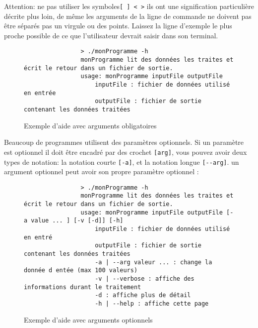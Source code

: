 		Attention: ne pas utiliser les symboles\verb+[ ] < >+ ils ont une signification particulière décrite plus loin, de même les arguments de la ligne de commande ne doivent pas être séparés pas un virgule ou des points. Laissez la ligne d'exemple le plus proche possible de ce que l’utilisateur devrait saisir dans son terminal.

		\begin{figure}[H]
			\begin{changemargin}{-2.5cm}{-2.5cm}
			\begin{tcolorbox}
			\begin{verbatim}
				> ./monProgramme -h
				monProgramme lit des données les traites et écrit le retour dans un fichier de sortie.
				usage: monProgramme inputFile outputFile
				    inputFile : fichier de données utilisé en entrée
				    outputFile : fichier de sortie contenant les données traitées
			\end{verbatim}
			\end{tcolorbox}
			\end{changemargin}
			\caption{Exemple d'aide avec arguments obligatoires}
		\end{figure}

		Beaucoup de programmes utilisent des paramètres optionnels. Si un paramètre est optionnel il doit être encadré par des crochet \verb+[arg]+, vous pouvez avoir deux types de notation: la notation courte \verb+[-a]+, et la notation longue \verb+[--arg]+. un argument optionnel peut avoir son propre paramètre optionnel :

		\begin{figure}[H]
			\begin{changemargin}{-2.5cm}{-2.5cm}
			\begin{tcolorbox}
			\begin{verbatim}
				> ./monProgramme -h
				monProgramme lit des données les traites et écrit le retour dans un fichier de sortie.
				usage: monProgramme inputFile outputFile [-a value ... ] [-v [-d]] [-h]
				    inputFile : fichier de données utilisé en entré
				    outputFile : fichier de sortie contenant les données traitées
				    -a | --arg valeur ... : change la donnée d entée (max 100 valeurs)
				    -v | --verbose : affiche des informations durant le traitement
				    -d : affiche plus de détail
				    -h | --help : affiche cette page
			\end{verbatim}
			\end{tcolorbox}
			\end{changemargin}
			\caption{Exemple d'aide avec arguments optionnels}
		\end{figure}

